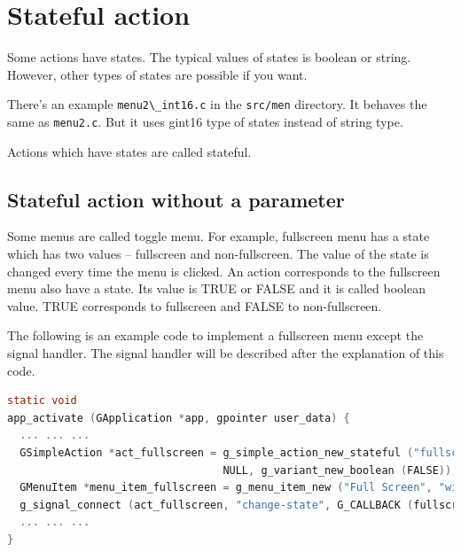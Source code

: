 \hypertarget{stateful-action}{%
\section{Stateful action}\label{stateful-action}}

Some actions have states. The typical values of states is boolean or
string. However, other types of states are possible if you want.

There's an example \passthrough{\lstinline!menu2\_int16.c!} in the
\passthrough{\lstinline!src/men!} directory. It behaves the same as
\passthrough{\lstinline!menu2.c!}. But it uses gint16 type of states
instead of string type.

Actions which have states are called stateful.

\hypertarget{stateful-action-without-a-parameter}{%
\subsection{Stateful action without a
parameter}\label{stateful-action-without-a-parameter}}

Some menus are called toggle menu. For example, fullscreen menu has a
state which has two values -- fullscreen and non-fullscreen. The value
of the state is changed every time the menu is clicked. An action
corresponds to the fullscreen menu also have a state. Its value is TRUE
or FALSE and it is called boolean value. TRUE corresponds to fullscreen
and FALSE to non-fullscreen.

The following is an example code to implement a fullscreen menu except
the signal handler. The signal handler will be described after the
explanation of this code.

\begin{lstlisting}[language=C]
static void
app_activate (GApplication *app, gpointer user_data) {
  ... ... ...
  GSimpleAction *act_fullscreen = g_simple_action_new_stateful ("fullscreen",
                                  NULL, g_variant_new_boolean (FALSE));
  GMenuItem *menu_item_fullscreen = g_menu_item_new ("Full Screen", "win.fullscreen");
  g_signal_connect (act_fullscreen, "change-state", G_CALLBACK (fullscreen_changed), win);
  ... ... ...
}
\end{lstlisting}

